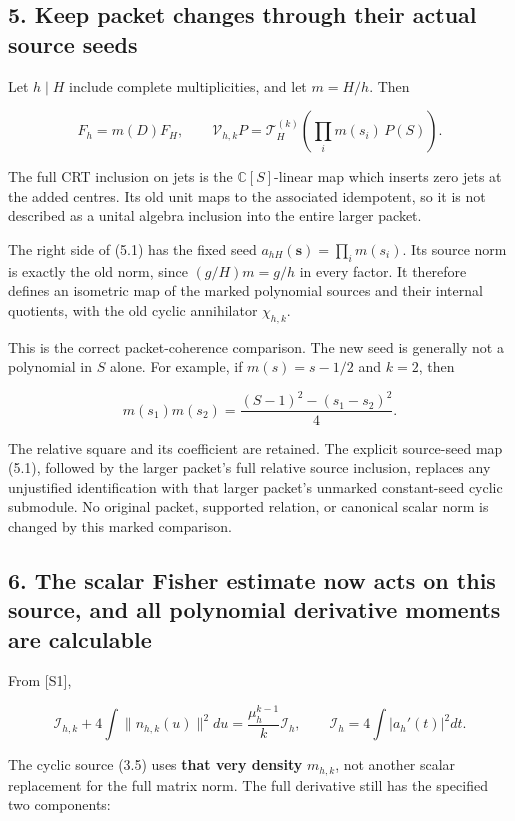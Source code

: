 \documentclass[
]{article}
\begin{document}
\subsection{5. Keep packet changes through their actual source
seeds}\label{keep-packet-changes-through-their-actual-source-seeds}

Let \(h\mid H\) include complete multiplicities, and let \(m=H/h\). Then

\[F_h=m(D)F_H,\qquad
\mathcal V_{h,k}P=\mathcal T_H^{(k)}\left(\prod_i m(s_i)\,P(S)\right).\tag{5.1}\]

The full CRT inclusion on jets is the \(\mathbb C[S]\)-linear map which
inserts zero jets at the added centres. Its old unit maps to the
associated idempotent, so it is not described as a unital algebra
inclusion into the entire larger packet.

The right side of (5.1) has the fixed seed
\(a_{hH}(\mathbf s)=\prod_i m(s_i)\). Its source norm is exactly the old
norm, since \((g/H)m=g/h\) in every factor. It therefore defines an
isometric map of the marked polynomial sources and their internal
quotients, with the old cyclic annihilator \(\chi_{h,k}\).

This is the correct packet-coherence comparison. The new seed is
generally not a polynomial in \(S\) alone. For example, if
\(m(s)=s-1/2\) and \(k=2\), then

\[m(s_1)m(s_2)=\frac{(S-1)^2-(s_1-s_2)^2}{4}.\tag{5.2}\]

The relative square and its coefficient are retained. The explicit
source-seed map (5.1), followed by the larger packet's full relative
source inclusion, replaces any unjustified identification with that
larger packet's unmarked constant-seed cyclic submodule. No original
packet, supported relation, or canonical scalar norm is changed by this
marked comparison.

\subsection{6. The scalar Fisher estimate now acts on this source, and
all polynomial derivative moments are
calculable}\label{the-scalar-fisher-estimate-now-acts-on-this-source-and-all-polynomial-derivative-moments-are-calculable}

From {[}S1{]},

\[\mathcal I_{h,k}+4\int\|n_{h,k}(u)\|^2du
=\frac{\mu_h^{k-1}}k\mathcal I_h,
\qquad \mathcal I_h=4\int|a_h'(t)|^2dt.\tag{6.1}\]

The cyclic source (3.5) uses \textbf{that very density} \(m_{h,k}\), not
another scalar replacement for the full matrix norm. The full derivative
still has the specified two components:
\end{document}
